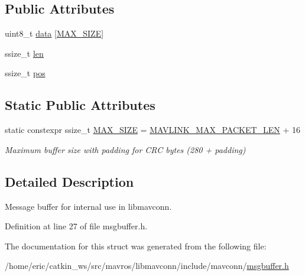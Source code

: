 \subsection*{Public Attributes}
\begin{DoxyCompactItemize}
\item 
uint8\+\_\+t \mbox{\hyperlink{group__mavconn_gafac3ddb58cafe6448ff6f046a73a66a5}{data}} \mbox{[}\mbox{\hyperlink{group__mavconn_ga7187a6a6dd41cfe0e92d2c59c81a0010}{M\+A\+X\+\_\+\+S\+I\+ZE}}\mbox{]}
\item 
ssize\+\_\+t \mbox{\hyperlink{group__mavconn_ga712063584cbb6fa1ffb3cb30d0b2bd61}{len}}
\item 
ssize\+\_\+t \mbox{\hyperlink{group__mavconn_gaf3493729d445b0f55b2ced8cfc5fa0f6}{pos}}
\end{DoxyCompactItemize}
\subsection*{Static Public Attributes}
\begin{DoxyCompactItemize}
\item 
static constexpr ssize\+\_\+t \mbox{\hyperlink{group__mavconn_ga7187a6a6dd41cfe0e92d2c59c81a0010}{M\+A\+X\+\_\+\+S\+I\+ZE}} = \mbox{\hyperlink{include__v2_80_2mavlink__types_8h_a473ed646f44ca10001777e8f150508a6}{M\+A\+V\+L\+I\+N\+K\+\_\+\+M\+A\+X\+\_\+\+P\+A\+C\+K\+E\+T\+\_\+\+L\+EN}} + 16
\begin{DoxyCompactList}\small\item\em Maximum buffer size with padding for C\+RC bytes (280 + padding) \end{DoxyCompactList}\end{DoxyCompactItemize}


\subsection{Detailed Description}
Message buffer for internal use in libmavconn. 

Definition at line 27 of file msgbuffer.\+h.



The documentation for this struct was generated from the following file\+:\begin{DoxyCompactItemize}
\item 
/home/eric/catkin\+\_\+ws/src/mavros/libmavconn/include/mavconn/\mbox{\hyperlink{msgbuffer_8h}{msgbuffer.\+h}}\end{DoxyCompactItemize}
